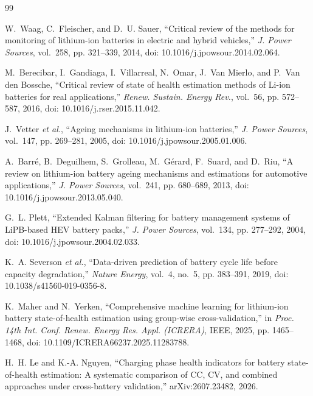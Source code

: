\begin{thebibliography}{99}

W.~Waag, C.~Fleischer, and D.~U. Sauer, ``Critical review of the methods for monitoring of lithium-ion batteries in electric and hybrid vehicles,'' \emph{J. Power Sources}, vol.~258, pp. 321--339, 2014, doi: 10.1016/j.jpowsour.2014.02.064.

M.~Berecibar, I.~Gandiaga, I.~Villarreal, N.~Omar, J.~Van Mierlo, and P.~Van den Bossche, ``Critical review of state of health estimation methods of {Li-ion} batteries for real applications,'' \emph{Renew. Sustain. Energy Rev.}, vol.~56, pp. 572--587, 2016, doi: 10.1016/j.rser.2015.11.042.

J.~Vetter \emph{et al.}, ``Ageing mechanisms in lithium-ion batteries,'' \emph{J. Power Sources}, vol.~147, pp. 269--281, 2005, doi: 10.1016/j.jpowsour.2005.01.006.

A.~Barr\'e, B.~Deguilhem, S.~Grolleau, M.~G\'erard, F.~Suard, and D.~Riu, ``A review on lithium-ion battery ageing mechanisms and estimations for automotive applications,'' \emph{J. Power Sources}, vol.~241, pp. 680--689, 2013, doi: 10.1016/j.jpowsour.2013.05.040.

G.~L. Plett, ``Extended {Kalman} filtering for battery management systems of {LiPB}-based {HEV} battery packs,'' \emph{J. Power Sources}, vol.~134, pp. 277--292, 2004, doi: 10.1016/j.jpowsour.2004.02.033.

K.~A. Severson \emph{et al.}, ``Data-driven prediction of battery cycle life before capacity degradation,'' \emph{Nature Energy}, vol.~4, no.~5, pp. 383--391, 2019, doi: 10.1038/s41560-019-0356-8.

K.~Maher and N.~Yerken, ``Comprehensive machine learning for lithium-ion battery state-of-health estimation using group-wise cross-validation,'' in \emph{Proc. 14th Int. Conf. Renew. Energy Res. Appl. (ICRERA)}, IEEE, 2025, pp. 1465--1468, doi: 10.1109/ICRERA66237.2025.11283788.

H.~H. Le and K.-A. Nguyen, ``Charging phase health indicators for battery state-of-health estimation: A systematic comparison of {CC}, {CV}, and combined approaches under cross-battery validation,'' arXiv:2607.23482, 2026.


\end{thebibliography}
